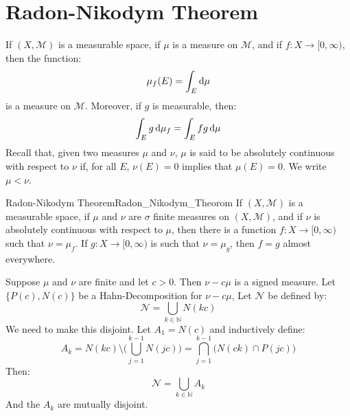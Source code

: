 \documentclass[crop=false,class=article]{standalone}                           %
\begin{document}
    \section{Radon-Nikodym Theorem}
        If $(X,\mathcal{M})$ is a measurable space, if $\mu$ is a measure on
        $\mathcal{M}$, and if $f:X\rightarrow[0,\infty)$, then the function:
        \begin{equation}
            \mu_{f}(E)=\int_{E}\mathop{}\!\mathrm{d}\mu
        \end{equation}
        is a measure on $\mathcal{M}$. Moreover, if $g$ is measurable, then:
        \begin{equation}
            \int_{E}g\mathop{}\!\mathrm{d}\mu_{f}=\int_{E}fg\mathop{}\!\mathrm{d}\mu
        \end{equation}
        Recall that, given two measures $\mu$ and $\nu$, $\mu$ is said to be
        absolutely continuous with respect to $\nu$ if, for all $E$,
        $\nu(E)=0$ implies that $\mu(E)=0$. We write $\mu<\nu$.
        \begin{ftheorem}{Radon-Nikodym Theorem}{Radon_Nikodym_Theorom}
            If $(X,\mathcal{M})$ is a measurable space, if $\mu$ and $\nu$ are
            $\sigma$ finite measures on $(X,\mathcal{M})$, and if $\nu$ is
            absolutely continuous with respect to $\mu$, then there is a
            function $f:X\rightarrow[0,\infty)$ such that $\nu=\mu_{f}$.
            If $g:X\rightarrow[0,\infty)$ is such that $\nu=\mu_{g}$, then
            $f=g$ almost everywhere.
        \end{ftheorem}
        \begin{bproof}
            Suppose $\mu$ and $\nu$ are finite and let $c>0$. Then $\nu-c\mu$
            is a signed measure. Let $\{P(c),N(c)\}$ be a Hahn-Decomposition
            for $\nu-c\mu$, Let $\mathcal{N}$ be defined by:
            \begin{equation}
                \mathcal{N}=\bigcup_{k\in\mathbb{N}}N(kc)
            \end{equation}
            We need to make this disjoint. Let $A_{1}=N(c)$ and inductively
            define:
            \begin{equation}
                A_{k}=N(kc)\setminus\Big(\bigcup_{j=1}^{k-1}N(jc)\Big)
                =\bigcap_{j=1}^{k-1}\Big(N(ck)\cap{P}(jc)\Big)
            \end{equation}
            Then:
            \begin{equation}
                \mathcal{N}=\bigcup_{k\in\mathbb{N}}A_{k}
            \end{equation}
            And the $A_{k}$ are mutually disjoint.
        \end{bproof}
\end{document}
